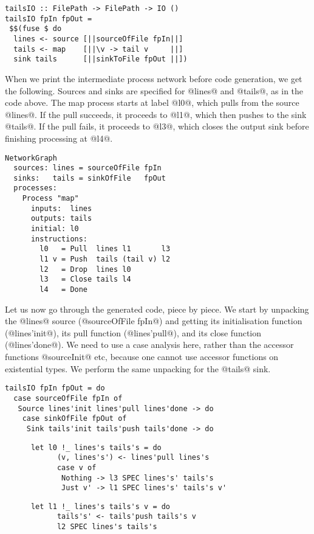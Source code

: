 \begin{lstlisting}
tailsIO :: FilePath -> FilePath -> IO ()
tailsIO fpIn fpOut =
 $$(fuse $ do
  lines <- source [||sourceOfFile fpIn||]
  tails <- map    [||\v -> tail v     ||]
  sink tails      [||sinkToFile fpOut ||])
\end{lstlisting}

When we print the intermediate process network before code generation, we get the following.
Sources and sinks are specified for @lines@ and @tails@, as in the code above.
The map process starts at label @l0@, which pulls from the source @lines@.
If the pull succeeds, it proceeds to @l1@, which then pushes to the sink @tails@.
If the pull fails, it proceeds to @l3@, which closes the output sink before finishing processing at @l4@.

\begin{lstlisting}
NetworkGraph
  sources: lines = sourceOfFile fpIn
  sinks:   tails = sinkOfFile   fpOut
  processes:
    Process "map"
      inputs:  lines
      outputs: tails
      initial: l0
      instructions:
        l0   = Pull  lines l1       l3
        l1 v = Push  tails (tail v) l2
        l2   = Drop  lines l0
        l3   = Close tails l4
        l4   = Done
\end{lstlisting}

Let us now go through the generated code, piece by piece.
We start by unpacking the @lines@ source (@sourceOfFile fpIn@) and getting its initialisation function (@lines'init@), its pull function (@lines'pull@), and its close function (@lines'done@).
We need to use a case analysis here, rather than the accessor functions @sourceInit@ etc, because one cannot use accessor functions on existential types.
We perform the same unpacking for the @tails@ sink.

\begin{lstlisting}
tailsIO fpIn fpOut = do
  case sourceOfFile fpIn of
   Source lines'init lines'pull lines'done -> do
    case sinkOfFile fpOut of
     Sink tails'init tails'push tails'done -> do
\end{lstlisting}

\begin{lstlisting}
      let l0 !_ lines's tails's = do
            (v, lines's') <- lines'pull lines's
            case v of
             Nothing -> l3 SPEC lines's' tails's
             Just v' -> l1 SPEC lines's' tails's v'
\end{lstlisting}

\begin{lstlisting}
      let l1 !_ lines's tails's v = do
            tails's' <- tails'push tails's v
            l2 SPEC lines's tails's
\end{lstlisting}


